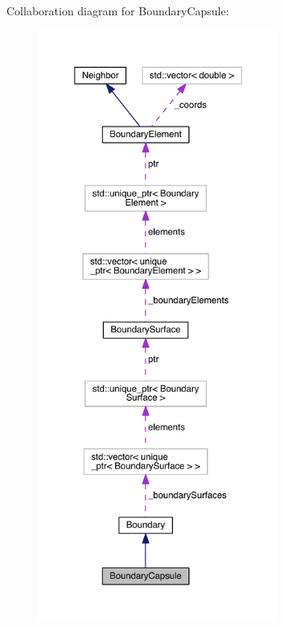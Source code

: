 Collaboration diagram for Boundary\+Capsule\+:
\nopagebreak
\begin{figure}[H]
\begin{center}
\leavevmode
\includegraphics[height=550pt]{classBoundaryCapsule__coll__graph}
\end{center}
\end{figure}

